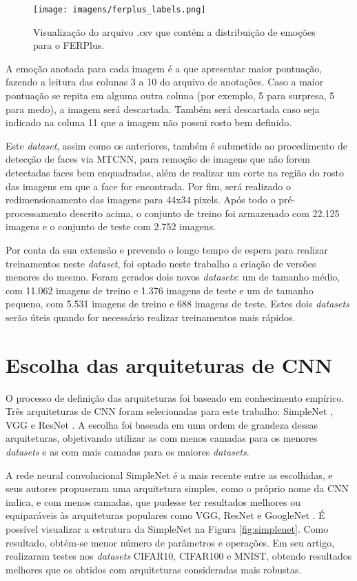 \documentclass[
12pt,       %
openright,      %
oneside,      %
a4paper,      %
english,      %
french,       %
spanish,      %
brazil        %
]{abntex2}
\begin{document}
\begin{figure}[ht]
\centering
\caption{Visualização do arquivo .csv que contém a distribuição de emoções para o FERPlus.}
\texttt{[image: imagens/ferplus\_labels.png]}
\label{fig:ferplus_labels}
\end{figure}

A emoção anotada para cada imagem é a que apresentar maior pontuação, fazendo a leitura das colunas 3 a 10 do arquivo de anotações. Caso a maior pontuação se repita em alguma outra coluna (por exemplo, 5 para surpresa, 5 para medo), a imagem será descartada. Também será descartada caso seja indicado na coluna 11 que a imagem não possui rosto bem definido.

Este \textit{dataset}, assim como os anteriores, também é submetido ao procedimento de detecção de faces via MTCNN, para remoção de imagens que não forem detectadas faces bem enquadradas, além de realizar um corte na região do rosto das imagens em que a face for encontrada. Por fim, será realizado o redimensionamento das imagens para 44x34 pixels. Após todo o pré-processamento descrito acima, o conjunto de treino foi armazenado com 22.125 imagens e o conjunto de teste com 2.752 imagens.

Por conta da sua extensão e prevendo o longo tempo de espera para realizar treinamentos neste \textit{dataset}, foi optado neste trabalho a criação de versões menores do mesmo. Foram gerados dois novos \textit{datasets}: um de tamanho médio, com 11.062 imagens de treino e 1.376 imagens de teste e um de tamanho pequeno, com 5.531 imagens de treino e 688 imagens de teste. Estes dois \textit{datasets} serão úteis quando for necessário realizar treinamentos mais rápidos.

\section{Escolha das arquiteturas de CNN} \label{escolha-arquiteturas}

O processo de definição das arquiteturas foi baseado em conhecimento empírico. Três arquiteturas de CNN foram selecionadas para este trabalho: SimpleNet \cite{hasanpour2016lets}, VGG \cite{simonyan2014very} e ResNet \cite{he2016deep}. A escolha foi baseada em uma ordem de grandeza dessas arquiteturas, objetivando utilizar as com menos camadas para os menores \textit{datasets} e as com mais camadas para os maiores \textit{datasets}.

A rede neural convolucional SimpleNet é a mais recente entre as escolhidas, e seus autores propuseram uma arquitetura simples, como o próprio nome da CNN indica, e com menos camadas, que pudesse ter resultados melhores ou equiparáveis às arquiteturas populares como VGG, ResNet e GoogleNet \cite{szegedy2015going}. É possível visualizar a estrutura da SimpleNet na Figura \ref{fig:simplenet}. Como resultado, obtém-se menor número de parâmetros e operações. Em seu artigo,  realizaram testes nos \textit{datasets} CIFAR10, CIFAR100 e MNIST, obtendo resultados melhores que os obtidos com arquiteturas consideradas mais robustas.
\end{document}
